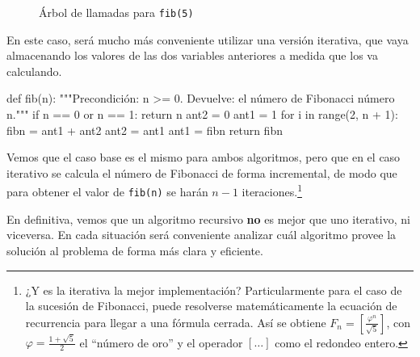 \begin{figure}[htb]
\caption{Árbol de llamadas para \lstinline!fib(5)!}
\label{fibonacci}
\end{figure}

En este caso, será mucho más conveniente utilizar una versión iterativa,
que vaya almacenando los valores de las dos variables anteriores a medida
que los va calculando.

\begin{codigo-python-sn}
def fib(n):
    """Precondición: n >= 0.
       Devuelve: el número de Fibonacci número n."""
    if n == 0 or n == 1:
        return n
    ant2 = 0
    ant1 = 1
    for i in range(2, n + 1):
        fibn = ant1 + ant2
        ant2 = ant1
        ant1 = fibn
    return fibn
\end{codigo-python-sn}

Vemos que el caso base es el mismo para ambos algoritmos, pero que en el
caso iterativo se calcula el número de Fibonacci de forma incremental, de
modo que para obtener el valor de \lstinline!fib(n)! se harán $n-1$
iteraciones.\footnote{¿Y es la iterativa la mejor implementación?
Particularmente para el caso de la sucesión de Fibonacci, puede resolverse
matemáticamente la ecuación de recurrencia para llegar a una fórmula
cerrada. Así se obtiene $F_n = \left[ \frac{\varphi^n}{\sqrt5} \right]$, con
$\varphi = \frac{1 + \sqrt5}2$ el ``número de oro'' y el operador
$\left[ \dots \right]$ como el redondeo entero.}

\begin{atencion}
En definitiva, vemos que un algoritmo recursivo {\bf no} es mejor que uno
iterativo, ni viceversa.  En cada situación será conveniente analizar cuál
algoritmo provee la solución al problema de forma más clara y eficiente.
\end{atencion}

